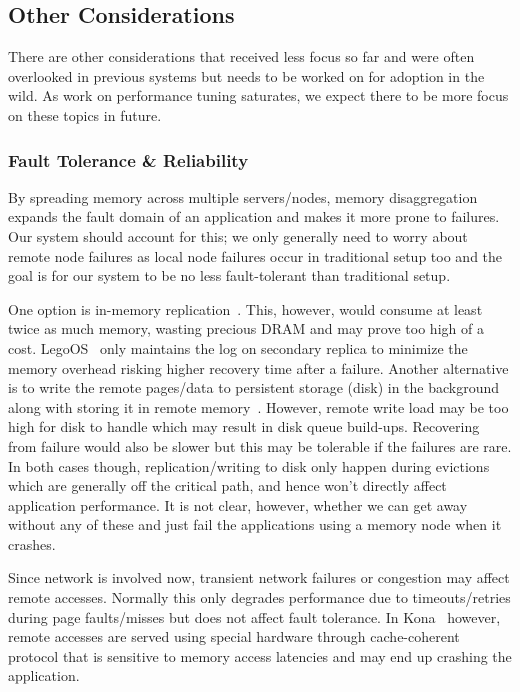 
\subsection{Other Considerations}
There are other considerations that received less focus so far 
and were often overlooked in previous systems but needs to be 
worked on for adoption in the wild. As work on performance tuning 
saturates, we expect there to be more focus on these topics in future. 

\subsubsection{Fault Tolerance \& Reliability}
By spreading memory across multiple servers/nodes, memory 
disaggregation expands the fault domain of an application 
and makes it more prone to failures. Our system should account
for this; we only generally need to worry about remote node 
failures as local node failures occur in traditional 
setup too and the goal is for our system to be no less 
fault-tolerant than traditional setup.

One option is in-memory replication~\cite{leap,kona}.
This, however, would consume at least twice as much memory,
wasting precious DRAM and may prove too high of a cost. 
LegoOS~\cite{legoos} only maintains the log on secondary 
replica to minimize the memory overhead risking higher 
recovery time after a failure. Another alternative 
is to write the remote pages/data to persistent storage (disk) 
in the background along with storing it in remote 
memory~\cite{infiniswap}. However, remote write load 
may be too high for disk to handle which may result in 
disk queue build-ups. Recovering from failure would also be 
slower but this may be tolerable if the failures are rare.
In both cases though, replication/writing to disk only happen 
during evictions which are generally off the critical path,
and hence won't directly affect application performance.
It is not clear, however, whether we can get away without 
any of these and just fail the applications using a memory
node when it crashes.

Since network is involved now, transient network failures
or congestion may affect remote accesses. Normally this only degrades 
performance due to timeouts/retries during page faults/misses
but does not affect fault tolerance. In Kona~\cite{kona} however,
remote accesses are served using special hardware through 
cache-coherent protocol that is sensitive to memory access 
latencies and may end up crashing the application.

